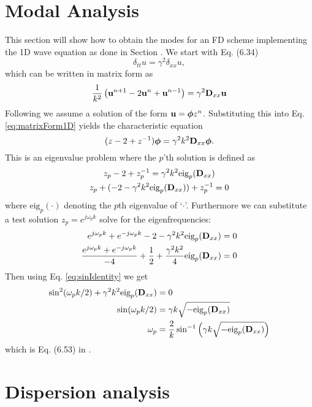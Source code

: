 \section{Modal Analysis}

This section will show how to obtain the modes for an FD scheme implementing the 1D wave equation as done in Section . We start with Eq. (6.34)
\begin{equation}
    \delta_{tt}u = \gamma^2\delta_{xx}u,
\end{equation}
which can be written in matrix form as
\begin{equation}\label{eq:matrixForm1D}
    \frac{1}{k^2}\left(\mathbf{u}^{n+1}-2\mathbf{u}^n+\mathbf{u}^{n-1}\right) = \gamma^2 \mathbf{D}_{xx}\mathbf{u}
\end{equation}
Following \cite{theBible} we assume a solution of the form $\mathbf{u} = \boldsymbol{\phi}z^n$. Substituting this into Eq. \eqref{eq:matrixForm1D} yields the characteristic equation
\begin{equation}
    (z - 2 + z^{-1})\boldsymbol{\phi} = \gamma^2k^2\mathbf{D}_{xx} \boldsymbol{\phi}.
\end{equation}
This is an eigenvalue problem where the $p$'th solution is defined as 
\begin{gather}
    z_p-2+z_p^{-1} = \gamma^2k^2\text{eig}_p(\mathbf{D}_{xx})\nonumber\\
    z_p+(-2-\gamma^2k^2\text{eig}_p(\mathbf{D}_{xx}))+z_p^{-1}=0
\end{gather}
where $\text{eig}_p(\cdot)$ denoting the $p$th eigenvalue of `$\cdot$'.  Furthermore we can substitute a test solution $z_p=e^{j\omega_pk}$ solve for the eigenfrequencies:
\begin{align*}
    e^{j\omega_pk}+e^{-j\omega_pk}-2-\gamma^2k^2\text{eig}_p(\mathbf{D}_{xx})&=0\\
    \frac{e^{j\omega_pk}+e^{-j\omega_pk}}{-4}+\frac{1}{2}+\frac{\gamma^2k^2}{4}\text{eig}_p(\mathbf{D}_{xx})&=0
\end{align*}
Then using Eq. \eqref{eq:sinIdentity} we get
\begin{align}
    \sin^2(\omega_pk/2)+\gamma^2k^2\text{eig}_p(\mathbf{D}_{xx})&=0\nonumber\\
    \sin(\omega_pk/2)&=\gamma k\sqrt{-\text{eig}_p(\mathbf{D}_{xx})}\nonumber\\
    \omega_p &= \frac{2}{k}\sin^{-1}\left(\gamma k\sqrt{-\text{eig}_p(\mathbf{D}_{xx})}\right)
\end{align}
which is Eq. (6.53) in \cite{theBible}.

\section{Dispersion analysis}
